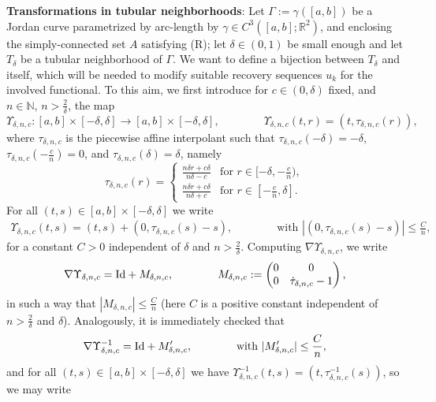 \documentclass[a4paper,11pt]{article}
\numberwithin{equation}{section}
\newcommand{\R}{\mathbb{R}}
\begin{document}
 
 \textbf{Transformations in tubular neighborhoods}:
Let $\Gamma:=\gamma([a,b])$ be a Jordan curve parametrized by arc-length by $\gamma\in C^3([a,b];\R^2)$, and  enclosing the  simply-connected set $A$ satisfying (R); let $\delta\in(0,1)$ be small enough and let $T_\delta$ be a tubular neighborhood of $\Gamma$. We want to define a bijection between $T_\delta$ and itself, which will be needed to modify suitable recovery sequences $u_k$ for the involved functional. To this aim, we first introduce for $c\in (0,\delta)$ fixed, and $n\in \mathbb N$, $n>\frac2\delta$,  the map
$$\Upsilon_{\delta,n,c}:[a,b]\times [-\delta,\delta]\rightarrow[a,b]\times [-\delta,\delta],\qquad\qquad \Upsilon_{\delta,n,c}(t,r)=(t,\tau_{\delta,n,c}(r)),$$
where $\tau_{\delta,n,c}$ is the piecewise affine interpolant such that $\tau_{\delta,n,c}(-\delta)=-\delta$, $\tau_{\delta,n,c}(-\frac{c}{n})=0$, and $\tau_{\delta,n,c}(\delta)=\delta$, namely
$$\tau_{\delta,n,c}(r)=\begin{cases}
						\frac{n\delta r+c\delta}{n\delta -c}&\text{for }r\in[-\delta,-\frac cn),\\
							\frac{n\delta r+c\delta}{n\delta+c}&\text{for }r\in[-\frac cn,\delta].
					\end{cases}$$
For all $(t,s)\in [a,b]\times [-\delta,\delta]$ we write
\begin{align}\label{Y}
\Upsilon_{\delta,n,c}(t,s)=(t,s)+(0,\tau_{\delta,n,c}(s)-s),\qquad \qquad\text{with } |(0,\tau_{\delta,n,c}(s)-s)|\leq \frac{C}{n},
\end{align}	
for a constant $C>0$ independent of $\delta$ and $n>\frac2\delta$.
Computing $\nabla \Upsilon_{\delta,n,c}$, we write
\begin{align}\label{nablaY}
\nabla \Upsilon_{\delta,n,c}=\text{{\rm Id}}+M_{\delta,n,c},\qquad \qquad M_{\delta,n,c}:=\begin{pmatrix} 0&0\\0&\dot\tau_{\delta,n,c}-1
\end{pmatrix},
\end{align}
in such a way that $|M_{\delta,n,c}|\leq \frac{C}{n}$ (here  $C$ is a positive constant independent of $n>\frac2\delta$ and $\delta$). Analogously, it is immediately checked that
			\begin{align}\label{nablaYinverse}
				\nabla \Upsilon^{-1}_{\delta,n,c}=\text{{\rm Id}}+M'_{\delta,n,c},\qquad \qquad
				\text{with }|M'_{\delta,n,c}|\leq \frac{C}{n},
			\end{align}	
and for all $(t,s)\in [a,b]\times [-\delta,\delta]$ we have $\Upsilon_{\delta,n,c}^{-1}(t,s)=(t,\tau_{\delta,n,c}^{-1}(s))$, so we may write
\end{document}
